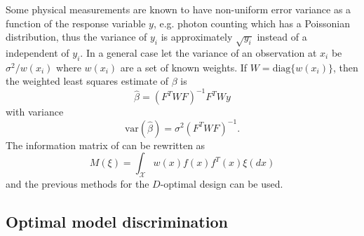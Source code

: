 \documentclass[12pt]{iopart}
\begin{document}
Some physical measurements are known to have non-uniform error variance as a function of the response variable $y$, e.g. photon counting which has a Poissonian distribution, thus the variance of $y_i$ is approximately $\sqrt{y_i}$ instead of a independent of $y_i$. In a general case let the variance of an observation at $x_i$ be $\sigma^2/w(x_i)$ where $w(x_i)$ are a set of known weights. If $W = \mathrm{diag}\{w(x_i)\}$, then the weighted least squares estimate of $\beta$ is
\begin{equation}
\hat \beta = (F^T W F)^{-1} F^T W y
\end{equation}
with variance
\begin{equation}
\mathrm{var}(\hat \beta) = \sigma^2 (F^T W F)^{-1}.
\end{equation}
The information matrix of  can be rewritten as
\begin{equation}
M(\xi) = \int_{\mathcal{X}} w(x) f(x)f^T(x) \xi(dx)
\end{equation}
and the previous methods for the $D$-optimal design can be used.

%
%
%
%
%


\subsection{Optimal model discrimination}
\end{document}
